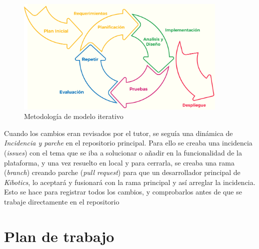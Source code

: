  \begin{figure}[H]
    \centering
    \includegraphics[width=0.9\textwidth]{img/metodoiterativo.png}
    \caption{Metodología de modelo iterativo} \label{fig:metodo}
\end{figure}

Cuando los cambios eran revisados por el tutor, se seguía una dinámica de \textit{Incidencia y parche} en el repositorio principal. Para ello se creaba una incidencia (\textit{issues}) con el tema que se iba a solucionar o añadir en la funcionalidad de la plataforma, y una vez resuelto en local y para cerrarla, se creaba una rama (\textit{branch}) creando parche (\textit{pull request}) para que un desarrollador principal de \textit{Kibotics}, lo aceptará y fusionará con la rama principal y así arreglar la incidencia. Esto se hace para registrar todos los cambios, y comprobarlos antes de que se trabaje directamente en el repositorio



\section{Plan de trabajo}
\label{sec:plan}

